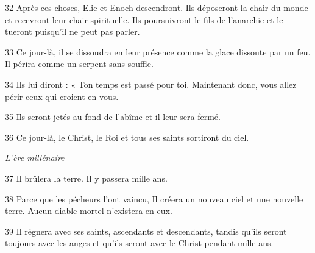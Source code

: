 \par 32 Après ces choses, Elie et Enoch descendront. Ils déposeront la chair du monde et recevront leur chair spirituelle. Ils poursuivront le fils de l'anarchie et le tueront puisqu'il ne peut pas parler.

\par 33 Ce jour-là, il se dissoudra en leur présence comme la glace dissoute par un feu. Il périra comme un serpent sans souffle.

\par 34 Ils lui diront : « Ton temps est passé pour toi. Maintenant donc, vous allez périr ceux qui croient en vous.

\par 35 Ils seront jetés au fond de l'abîme et il leur sera fermé.

\par 36 Ce jour-là, le Christ, le Roi et tous ses saints sortiront du ciel.

\par \textit{L'ère millénaire}

\par 37 Il brûlera la terre. Il y passera mille ans.

\par 38 Parce que les pécheurs l'ont vaincu, Il créera un nouveau ciel et une nouvelle terre. Aucun diable mortel n’existera en eux.

\par 39 Il régnera avec ses saints, ascendants et descendants, tandis qu'ils seront toujours avec les anges et qu'ils seront avec le Christ pendant mille ans.

